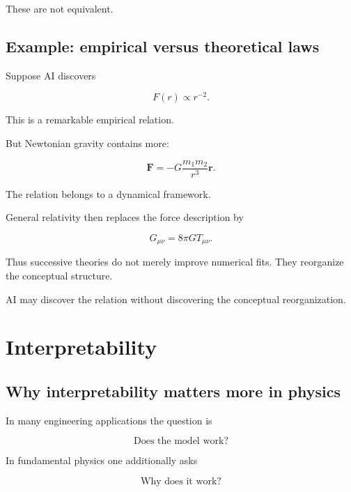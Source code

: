 \documentclass[11pt,a4paper,oneside]{book}
\begin{document}
These are not equivalent.

\section{Example: empirical versus theoretical laws}

Suppose AI discovers

\begin{equation}
F(r)\propto r^{-2}.
\end{equation}

This is a remarkable empirical relation.

But Newtonian gravity contains more:

\begin{equation}
\mathbf{F}
=
-G
\frac{m_1m_2}{r^3}
\mathbf{r}.
\end{equation}

The relation belongs to a dynamical framework.

General relativity then replaces the force description by

\begin{equation}
G_{\mu\nu}
=
8\pi G T_{\mu\nu}.
\end{equation}

Thus successive theories do not merely improve numerical fits. They reorganize
the conceptual structure.

AI may discover the relation without discovering the conceptual reorganization.

\chapter{Interpretability}

\section{Why interpretability matters more in physics}

In many engineering applications the question is

\begin{equation}
\text{Does the model work?}
\end{equation}

In fundamental physics one additionally asks

\begin{equation}
\text{Why does it work?}
\end{equation}
\end{document}
